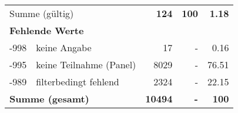 \begin{longtable}{lXrrr}
     \midrule
     \multicolumn{2}{l}{Summe (gültig)} &
       \textbf{\num{124}} &
     \textbf{100} &
       \textbf{\num[round-mode=places,round-precision=2]{1,18}} \\
     \multicolumn{5}{l}{\textbf{Fehlende Werte}}\\
       -998 &
       keine Angabe &
         \num{17} &
        - &
         \num[round-mode=places,round-precision=2]{0,16} \\
       -995 &
       keine Teilnahme (Panel) &
         \num{8029} &
        - &
         \num[round-mode=places,round-precision=2]{76,51} \\
       -989 &
       filterbedingt fehlend &
         \num{2324} &
        - &
         \num[round-mode=places,round-precision=2]{22,15} \\
     \midrule
     \multicolumn{2}{l}{\textbf{Summe (gesamt)}} &
          \textbf{\num{10494}} &
        \textbf{-} &
        \textbf{100} \\
     \bottomrule
     \end{longtable}
     
